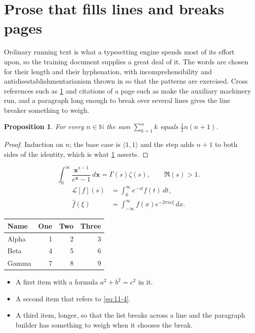 \documentclass[11pt,a4paper]{report}
\theoremstyle{plain}
\newtheorem{proposition}{Proposition}[chapter]
\newcommand{\vecn}[1]{\mathbf{#1}}
\newcommand{\pairs}[2]{\langle #1,#2\rangle}
\begin{document}
\section{Prose that fills lines and breaks pages}
\label{sec:prose11-4}
Ordinary running text is what a typesetting engine spends most of its effort
upon, so the training document supplies a great deal of it. The words are
chosen for their length and their hyphenation, with incomprehensibility and
antidisestablishmentarianism thrown in so that the patterns are exercised.
Cross references such as \cref{sec:prose11-4} and citations of a page such
as \pageref{sec:prose11-4} make the auxiliary machinery run, and a
paragraph long enough to break over several lines gives the line breaker
something to weigh.
\begin{proposition}\label{prop:11-4}
For every $n\in\mathbb{N}$ the sum $\sum_{k=1}^{n}k$ equals
$\tfrac{1}{2}n(n+1)$.
\end{proposition}
\begin{proof}
Induction on $n$; the base case is $\pairs{1}{1}$ and the step adds $n+1$ to
both sides of the identity, which is what \cref{prop:11-4} asserts.
\end{proof}
\begin{equation}\label{eq:11-4}
  \int_{0}^{\infty}\frac{\vecn{x}^{s-1}}{e^{\vecn{x}}-1}\,d\vecn{x}
    = \Gamma(s)\zeta(s),\qquad \Re(s)>1 .
\end{equation}
\begin{align}
  \mathcal{L}[f](s) &= \int_{0}^{\infty} e^{-st} f(t)\,dt, \\
  \widehat{f}(\xi)  &= \int_{-\infty}^{\infty} f(x) e^{-2\pi i x\xi}\,dx .
\end{align}
\par\noindent\begin{center}
\begin{tabular}{lrrr}
\hline
Name & One & Two & Three \\
\hline
Alpha & 1 & 2 & 3 \\
Beta & 4 & 5 & 6 \\
Gamma & 7 & 8 & 9 \\
\hline
\end{tabular}
\end{center}
\begin{itemize}
  \item A first item with a formula $a^2+b^2=c^2$ in it.
  \item A second item that refers to \eqref{eq:11-4}.
  \item A third item, longer, so that the list breaks across a line and the
    paragraph builder has something to weigh when it chooses the break.
\end{itemize}
\end{document}
